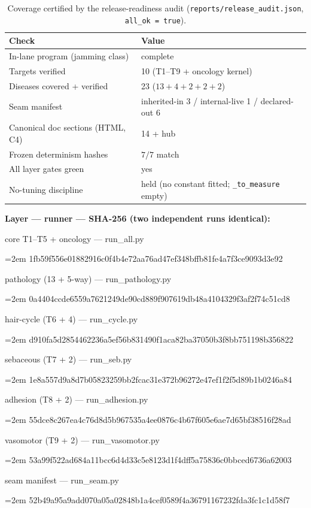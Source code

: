\documentclass[11pt,a4paper]{article}
\begin{document}
\begin{table}[h]
\centering\small
\caption{Coverage certified by the release-readiness audit (\texttt{reports/release\_audit.json},
\texttt{all\_ok = true}).}
\begin{tabular}{l l}
\toprule
\textbf{Check} & \textbf{Value}\\
\midrule
In-lane program (jamming class) & complete\\
Targets verified & 10 \;(T1--T9 + oncology kernel)\\
Diseases covered + verified & 23 \;($13+4+2+2+2$)\\
Seam manifest & inherited-in 3 / internal-live 1 / declared-out 6\\
Canonical doc sections (HTML, C4) & 14 + hub\\
Frozen determinism hashes & $7/7$ match\\
All layer gates green & yes\\
No-tuning discipline & held (no constant fitted; \texttt{\_to\_measure} empty)\\
\bottomrule
\end{tabular}
\end{table}

\begingroup
\footnotesize\ttfamily\setlength{\parskip}{0.15em}
\textbf{\rmfamily Layer --- runner --- SHA-256 (two independent runs identical):}\par
\smallskip
core T1--T5 + oncology --- run\_all.py\par
\hangindent=2em 1fb59f556e01882916c0f4b4e72aa76ad47ef348bffb81fe4a7f3ce9093d3e92\par
pathology (13 + 5-way) --- run\_pathology.py\par
\hangindent=2em 0a4404ccde6559a7621249de90cd889f907619db48a4104329f3af2f74c51cd8\par
hair-cycle (T6 + 4) --- run\_cycle.py\par
\hangindent=2em d910fa5d2854462236a5ef56b831490f1aca82ba37050b3f8bb751198b356822\par
sebaceous (T7 + 2) --- run\_seb.py\par
\hangindent=2em 1e8a557d9a8d7b05823259bb2fcac31e372b96272e47ef1f2f5d89b1b0246a84\par
adhesion (T8 + 2) --- run\_adhesion.py\par
\hangindent=2em 55dce8c267ea4c76d8d5b967535a4ee0876c4b67f605e6ae7d65bf38516f28ad\par
vasomotor (T9 + 2) --- run\_vasomotor.py\par
\hangindent=2em 53a99f522ad684a11bcc6d4d33c5e8123d1f4dff5a75836c0bbced6736a62003\par
seam manifest --- run\_seam.py\par
\hangindent=2em 52b49a95a9add070a05a02848b1a4cef0589f4a36791167232fda3fc1c1d58f7\par
\endgroup
\end{document}
